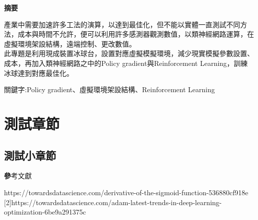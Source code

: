 \documentclass[14pt,a4paper]{report}
\begin{document}
\newpage
\begin{center}
\LARGE\textbf{摘要}\\
\begin{flushleft}
\fontsize{14pt}{2.5pt}\hspace{12pt} 產業中需要加速許多工法的演算，以達到最佳化，但不能以實體一直測試不同方法，成本與時間不允許，便可以利用許多感測器觀測數值，以類神經網路運算，在虛擬環境架設結構，遠端控制、更改數值。\\
\hspace{12pt} 此專題是利用現成裝置冰球台，設置對應虛擬模擬環境，減少現實模擬參數設置、成本，再加入類神經網路之中的Policy gradient與Reinforcement Learning，訓練冰球達到對應最佳化。
\end{flushleft}
\begin{center}
\fontsize{14pt}{2.5pt}關鍵字:Policy gradient、虛擬環境架設結構、Reinforcement Learning
\end{center}
\newpage
\renewcommand{\contentsname}{\centerline{\fontsize{18pt}{\baselineskip}\selectfont\textbf{目\quad 錄}}}
\tableofcontents
\newpage
\renewcommand{\listfigurename}{\centerline{\fontsize{18pt}{\baselineskip}\selectfont\textbf{圖\quad 表\quad 目\quad 錄 }}}
\listoffigures
\newpage
\end{center}
\newpage
\chapter{測試章節}
\setcounter{page}{1}
\newpage
\section{測試小章節}
\newpage
\begin{center}
\LARGE\textbf 參考文獻\\
\end{center}
\begin{flushleft}
\begin{Large}
[1]\quad https://towardsdatascience.com/derivative-of-the-sigmoid-function-536880cf918e\\

[2]\quad https://towardsdatascience.com/adam-latest-trends-in-deep-learning-optimization-6be9a291375c\\
\end{Large}
\end{flushleft}
\end{document}
